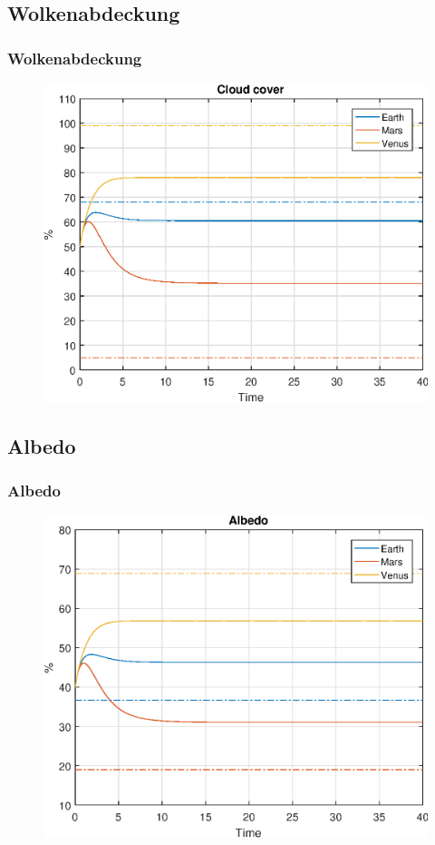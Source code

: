 \documentclass[ngerman]{beamer}
\begin{document}
\subsection{Wolkenabdeckung}
\begin{frame}
	\frametitle{Wolkenabdeckung}
		\begin{figure}
			\includegraphics[width=0.9\linewidth]{Matlab/figures/cloudCover.eps}
		\end{figure}
\end{frame}

\subsection{Albedo}
\begin{frame}
	\frametitle{Albedo}
		\begin{figure}
			\includegraphics[width=0.9\linewidth]{Matlab/figures/albedo.eps}
		\end{figure}
\end{frame}
\end{document}
